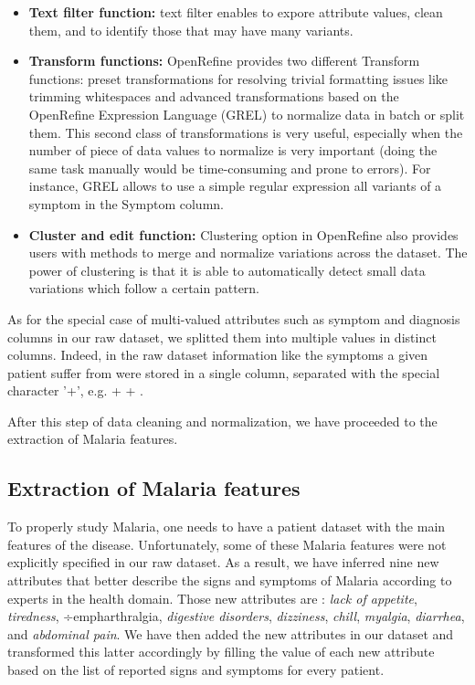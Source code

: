 \begin{itemize}
\item \textbf{Text filter function:} text filter enables to expore attribute values, clean them, and to identify those that may have many variants. 
\item \textbf{Transform functions:} OpenRefine provides two different Transform functions: preset transformations for resolving trivial formatting issues like trimming whitespaces
and advanced transformations based on the OpenRefine Expression Language (GREL) to normalize data in batch or split them. This second class of transformations is very useful, especially when the 
number of piece of data values to normalize is very important (doing the same task manually would be time-consuming and prone to errors). For instance, GREL allows to use a simple
regular expression all variants of a symptom in the Symptom column.  
\item \textbf{Cluster and edit function:} Clustering option in OpenRefine also provides users with methods to merge and normalize variations across the dataset. The power of clustering
is that it is able to automatically detect small data variations which follow a certain pattern.  
\end{itemize}

As for the special case of multi-valued attributes such as symptom and diagnosis columns in our raw dataset, we splitted them into multiple values in distinct columns.
Indeed, in the raw dataset information like the symptoms a given patient suffer from were stored in a single column, separated with the special character '+', e.g. 
+  + .


After this step of data cleaning and normalization, we have proceeded to the extraction of Malaria features.

\subsection{Extraction of Malaria features}
To properly study Malaria, one needs to have a patient dataset with the main features of the disease. 
Unfortunately, some of these Malaria features were not explicitly specified in our raw dataset.
As a result, we have inferred nine new attributes that better describe the signs and symptoms 
of Malaria according to experts in the health domain. Those new attributes are : \emph{lack of appetite}, \emph{tiredness}, ÷emph{arthralgia}, 
\emph{digestive disorders}, \emph{dizziness}, \emph{chill}, \emph{myalgia}, \emph{diarrhea}, and \emph{abdominal pain}.  
We have then added the new attributes in our dataset and transformed this latter accordingly by filling the value of each new attribute based on the 
list of reported signs and symptoms for every patient.

